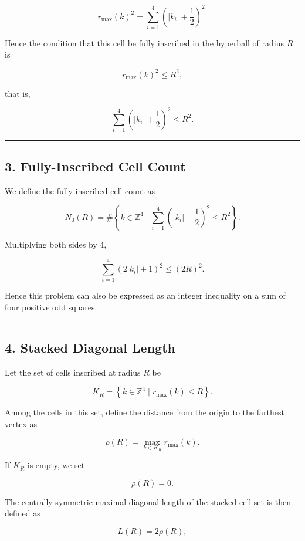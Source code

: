 \documentclass[
]{article}
\begin{document}
\[
r_{\max}(k)^2
=
\sum_{i=1}^{4}
\left(|k_i|+\frac12\right)^2 .
\]

Hence the condition that this cell be fully inscribed in the hyperball
of radius \(R\) is

\[
r_{\max}(k)^2\le R^2 ,
\]

that is,

\[
\sum_{i=1}^{4}
\left(|k_i|+\frac12\right)^2
\le R^2 .
\]

\begin{center}\rule{0.5\linewidth}{0.5pt}\end{center}

\subsection{3. Fully-Inscribed Cell
Count}\label{fully-inscribed-cell-count}

We define the fully-inscribed cell count as

\[
N_0(R)
=
\#\left\{
k\in\mathbb{Z}^4
\mid
\sum_{i=1}^{4}
\left(|k_i|+\frac12\right)^2
\le R^2
\right\} .
\]

Multiplying both sides by 4,

\[
\sum_{i=1}^{4}
(2|k_i|+1)^2
\le
(2R)^2 .
\]

Hence this problem can also be expressed as an integer inequality on a
sum of four positive odd squares.

\begin{center}\rule{0.5\linewidth}{0.5pt}\end{center}

\subsection{4. Stacked Diagonal Length}\label{stacked-diagonal-length}

Let the set of cells inscribed at radius \(R\) be

\[
K_R=
\left\{
k\in\mathbb{Z}^4
\mid
r_{\max}(k)\le R
\right\} .
\]

Among the cells in this set, define the distance from the origin to the
farthest vertex as

\[
\rho(R)
=
\max_{k\in K_R} r_{\max}(k) .
\]

If \(K_R\) is empty, we set

\[
\rho(R)=0 .
\]

The centrally symmetric maximal diagonal length of the stacked cell set
is then defined as

\[
L(R)=2\rho(R) ,
\]
\end{document}
